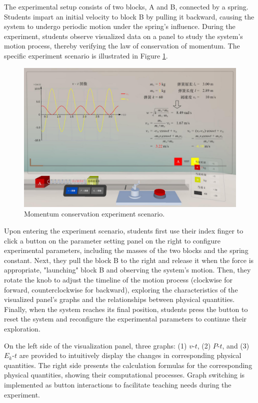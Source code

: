 The experimental setup consists of two blocks, A and B, connected by a spring. Students impart an initial velocity to block B by pulling it backward, causing the system to undergo periodic motion under the spring's influence. During the experiment, students observe visualized data on a panel to study the system's motion process, thereby verifying the law of conservation of momentum. The specific experiment scenario is illustrated in Figure \ref{fig:experiment-scenario}.

\begin{figure}
  \centering
  \includegraphics[width=\linewidth]{image/experiment-scenario.pdf}
  \caption{Momentum conservation experiment scenario.}
  \label{fig:experiment-scenario}
\end{figure}

Upon entering the experiment scenario, students first use their index finger to click a button on the parameter setting panel on the right to configure experimental parameters, including the masses of the two blocks and the spring constant. Next, they pull the block B to the right and release it when the force is appropriate, "launching" block B and observing the system's motion. Then, they rotate the knob to adjust the timeline of the motion process (clockwise for forward, counterclockwise for backward), exploring the characteristics of the visualized panel's graphs and the relationships between physical quantities. Finally, when the system reaches its final position, students press the button to reset the system and reconfigure the experimental parameters to continue their exploration.

On the left side of the visualization panel, three graphs: (1) $v$-$t$, (2) $P$-$t$, and (3) $E_k$-$t$ are provided to intuitively display the changes in corresponding physical quantities. The right side presents the calculation formulas for the corresponding physical quantities, showing their computational processes. Graph switching is implemented as button interactions to facilitate teaching needs during the experiment.

